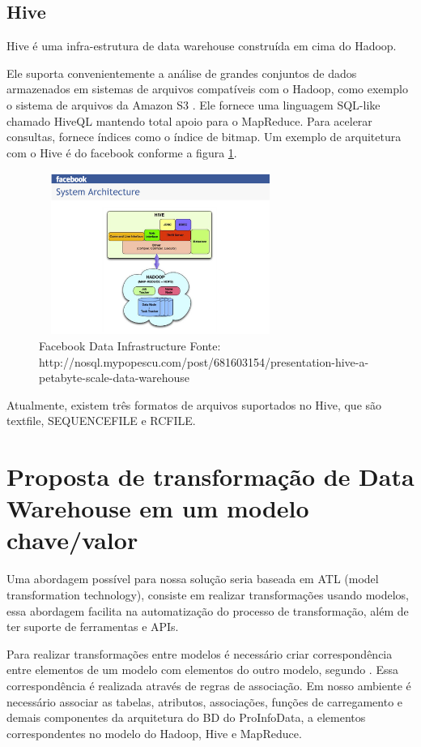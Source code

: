 \documentclass[a4paper,12pt]{article}
\begin{document}
\subsection{\textbf{Hive}}
Hive \cite{hive} é uma infra-estrutura de data warehouse construída em cima do
Hadoop. 

Ele suporta convenientemente a análise de grandes conjuntos de dados armazenados
em sistemas de arquivos compatíveis com o Hadoop,  como exemplo o sistema de
arquivos  da Amazon S3 \cite{amazon}. Ele fornece uma linguagem SQL-like chamado HiveQL
mantendo total apoio para o MapReduce. Para acelerar consultas, fornece índices
como o índice de bitmap. Um exemplo de arquitetura com o Hive é do facebook
conforme a figura \ref{hive}.

\begin{figure}[ht]
  \centering
  \includegraphics[width=300px,height=200px]{img/hive2.png}
  \caption{Facebook Data Infrastructure\newline
  Fonte: http://nosql.mypopescu.com/post/681603154/presentation-hive-a-petabyte-scale-data-warehouse}
  \label{hive}
\end{figure}
 
Atualmente, existem três formatos de arquivos suportados no Hive, que são
textfile, SEQUENCEFILE e RCFILE.


\section{\textbf{Proposta de transformação de Data Warehouse em um modelo chave/valor}}

Uma abordagem possível para nossa solução seria baseada em ATL (model
transformation technology), consiste em realizar transformações usando modelos,
essa abordagem facilita na automatização do processo de transformação, além de
ter suporte de ferramentas e APIs.

Para realizar transformações entre modelos é necessário criar correspondência
entre elementos de um modelo com elementos do outro modelo, segundo \cite{Didonet}.
Essa correspondência é realizada através de regras de associação. Em nosso
ambiente é necessário associar as tabelas, atributos, associações, funções de
carregamento e demais componentes da arquitetura do BD do ProInfoData, a
elementos correspondentes no modelo do Hadoop, Hive e MapReduce.
\end{document}
